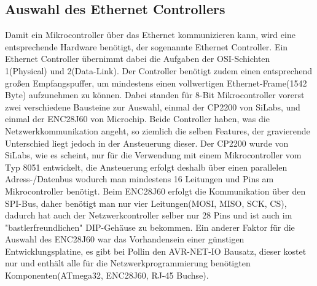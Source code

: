 \documentclass[a4paper,14pt,headsepline]{scrartcl}
\begin{document}
\subsection{Auswahl des Ethernet Controllers}
Damit ein Mikrocontroller über das Ethernet kommunizieren kann, wird eine entsprechende Hardware benötigt, der sogenannte Ethernet Controller. Ein Ethernet Controller übernimmt dabei die Aufgaben der OSI-Schichten 1(Physical) und 2(Data-Link). Der Controller benötigt zudem einen entsprechend großen Empfangspuffer, um mindestens einen vollwertigen Ethernet-Frame(1542 Byte) aufzunehmen zu können. Dabei standen für 8-Bit Mikrocontroller vorerst zwei verschiedene Bausteine zur Auswahl, einmal der CP2200 von SiLabs, und einmal der ENC28J60 von Microchip. Beide Controller haben, was die Netzwerkkommunikation angeht, so ziemlich die selben Features, der gravierende Unterschied liegt jedoch in der Ansteuerung dieser. Der CP2200 wurde von SiLabs, wie es scheint, nur für die Verwendung mit einem Mikrocontroller vom Typ 8051 entwickelt, die Ansteuerung erfolgt deshalb über einen parallelen Adress-/Datenbus wodurch man mindestens 16 Leitungen und Pins am Mikrocontroller benötigt. Beim ENC28J60 erfolgt die Kommunikation über den SPI-Bus, daher benötigt man nur vier Leitungen(MOSI, MISO, SCK, CS), dadurch hat auch der Netzwerkcontroller selber nur 28 Pins und ist auch im "bastlerfreundlichen" DIP-Gehäuse zu bekommen. Ein anderer Faktor für die Auswahl des ENC28J60 war das Vorhandensein einer günstigen Entwicklungsplatine, es gibt bei Pollin den AVR-NET-IO Bausatz, dieser kostet nur  und enthält alle für die Netzwerkprogrammierung benötigten Komponenten(ATmega32, ENC28J60, RJ-45 Buchse).
\end{document}
